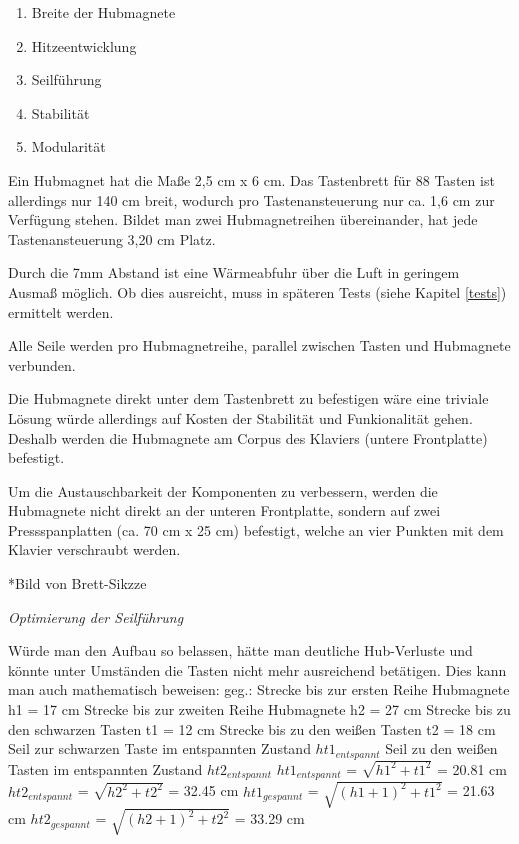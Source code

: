 \begin{enumerate}
	\item Breite der Hubmagnete
	\item Hitzeentwicklung
	\item Seilführung
	\item Stabilität
	\item Modularität
\end{enumerate}

Ein Hubmagnet hat die Maße 2,5 cm x 6 cm.
Das Tastenbrett für 88 Tasten ist allerdings nur 140 cm breit, wodurch pro Tastenansteuerung nur ca. 1,6 cm zur Verfügung stehen.
Bildet man zwei Hubmagnetreihen übereinander, hat jede Tastenansteuerung 3,20 cm Platz.

Durch die 7mm Abstand ist eine Wärmeabfuhr über die Luft in geringem Ausmaß möglich.
Ob dies ausreicht, muss in späteren Tests (siehe Kapitel \ref{tests}) ermittelt werden.

Alle Seile werden pro Hubmagnetreihe, parallel zwischen Tasten und Hubmagnete verbunden.

Die Hubmagnete direkt unter dem Tastenbrett zu befestigen wäre eine triviale Lösung würde allerdings auf Kosten der Stabilität und Funkionalität gehen.
Deshalb werden die Hubmagnete am Corpus des Klaviers (untere Frontplatte) befestigt.

Um die Austauschbarkeit der Komponenten zu verbessern, werden die Hubmagnete nicht direkt an der unteren Frontplatte,
sondern auf zwei Pressspanplatten (ca. 70 cm x 25 cm) befestigt, welche an vier Punkten mit dem Klavier verschraubt werden.

*Bild von Brett-Sikzze

\textit{Optimierung der Seilführung}

Würde man den Aufbau so belassen, hätte man deutliche Hub-Verluste und könnte unter Umständen die Tasten nicht mehr ausreichend betätigen.
\newline
Dies kann man auch mathematisch beweisen:
\newline geg.:
\newline Strecke bis zur ersten Reihe Hubmagnete h1 = 17 cm
\newline Strecke bis zur zweiten Reihe Hubmagnete h2 = 27 cm
\newline Strecke bis zu den schwarzen Tasten t1 = 12 cm
\newline Strecke bis zu den weißen Tasten t2 = 18 cm
\newline Seil zur schwarzen Taste im entspannten Zustand $ht1_{entspannt}$
\newline Seil zu den weißen Tasten im entspannten Zustand $ht2_{entspannt}$
\newline $ht1_{entspannt}$ = $\sqrt {h1^{2} + t1^{2}}$ = 20.81 cm
\newline $ht2_{entspannt}$ = $\sqrt {h2^{2} + t2^{2}}$ = 32.45 cm
\newline $ht1_{gespannt}$ = $\sqrt {(h1 + 1) ^{2} + t1^{2}}$ = 21.63 cm
\newline $ht2_{gespannt}$ = $\sqrt {(h2 + 1)^{2} + t2^{2}}$ = 33.29 cm

